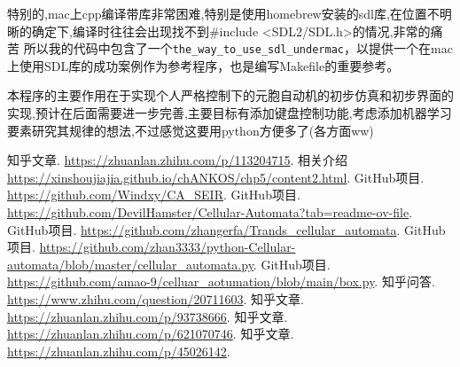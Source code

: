 \documentclass[forprint]{WHUBachelor}
\begin{document}
特别的,mac上cpp编译带库非常困难,特别是使用homebrew安装的sdl库,在位置不明晰的确定下,编译时往往会出现找不到\#include <SDL2/SDL.h>的情况,非常的痛苦
所以我的代码中包含了一个\texttt{the\_way\_to\_use\_sdl\_undermac}，以提供一个在mac上使用SDL库的成功案例作为参考程序，也是编写Makefile的重要参考。

本程序的主要作用在于实现个人严格控制下的元胞自动机的初步仿真和初步界面的实现,预计在后面需要进一步完善,主要目标有添加键盘控制功能,考虑添加机器学习要素研究其规律的想法,不过感觉这要用python方便多了(各方面ww)




\cleardoublepage{}
{}
\renewcommand{\baselinestretch}{1.6}
\begin{thebibliography}{00}
  
   知乎文章. \url{https://zhuanlan.zhihu.com/p/113204715}.
   相关介绍 \url{https://xinshoujiajia.github.io/chANKOS/chp5/content2.html}.
   GitHub项目. \url{https://github.com/Windxy/CA_SEIR}.
   GitHub项目. \url{https://github.com/DevilHamster/Cellular-Automata?tab=readme-ov-file}.
   GitHub项目. \url{https://github.com/zhangerfa/Trands_cellular_automata}.
   GitHub项目. \url{https://github.com/zhan3333/python-Cellular-automata/blob/master/cellular_automata.py}.
   GitHub项目. \url{https://github.com/amao-9/celluar_aotumation/blob/main/box.py}.
   知乎问答. \url{https://www.zhihu.com/question/20711603}.
   知乎文章. \url{https://zhuanlan.zhihu.com/p/93738666}.
   知乎文章. \url{https://zhuanlan.zhihu.com/p/621070746}.
   知乎文章. \url{https://zhuanlan.zhihu.com/p/45026142}.







\end{thebibliography}
\end{document}
